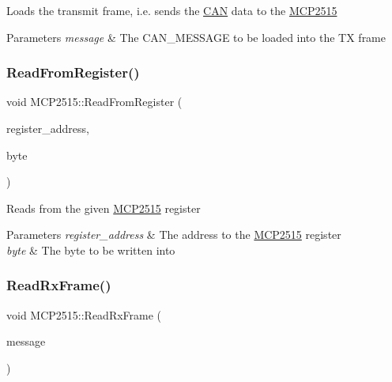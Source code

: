 Loads the transmit frame, i.\+e. sends the \hyperlink{class_c_a_n}{C\+AN} data to the \hyperlink{class_m_c_p2515}{M\+C\+P2515} 
\begin{DoxyParams}{Parameters}
{\em message} & The C\+A\+N\+\_\+\+M\+E\+S\+S\+A\+GE to be loaded into the TX frame \\
\hline
\end{DoxyParams}
\hypertarget{class_m_c_p2515_a09ef6973daccbf868d89986e727cfa1b}{}\label{class_m_c_p2515_a09ef6973daccbf868d89986e727cfa1b} 
\subsubsection{\texorpdfstring{Read\+From\+Register()}{ReadFromRegister()}}
{\footnotesize\ttfamily void M\+C\+P2515\+::\+Read\+From\+Register (\begin{DoxyParamCaption}\item[{uint8\+\_\+t}]{register\+\_\+address,  }\item[{uint8\+\_\+t \&}]{byte }\end{DoxyParamCaption})\hspace{0.3cm}{\ttfamily [private]}}

Reads from the given \hyperlink{class_m_c_p2515}{M\+C\+P2515} register 
\begin{DoxyParams}{Parameters}
{\em register\+\_\+address} & The address to the \hyperlink{class_m_c_p2515}{M\+C\+P2515} register \\
\hline
{\em byte} & The byte to be written into \\
\hline
\end{DoxyParams}
\hypertarget{class_m_c_p2515_ae9c114f9fd7248d78fe5617648f7571b}{}\label{class_m_c_p2515_ae9c114f9fd7248d78fe5617648f7571b} 
\subsubsection{\texorpdfstring{Read\+Rx\+Frame()}{ReadRxFrame()}}
{\footnotesize\ttfamily void M\+C\+P2515\+::\+Read\+Rx\+Frame (\begin{DoxyParamCaption}\item[{\hyperlink{struct_can_message}{Can\+Message} \&}]{message }\end{DoxyParamCaption})\hspace{0.3cm}{\ttfamily [private]}}

